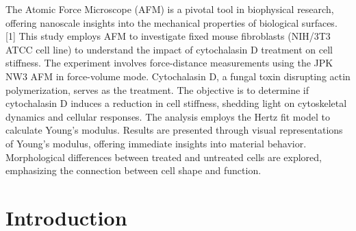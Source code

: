 \documentclass[a4paper,english,12pt,bibliography=totoc]{scrreprt}
\begin{document}
The Atomic Force Microscope (AFM) is a pivotal tool in biophysical research, offering nanoscale insights into the mechanical properties of biological surfaces. [1] This study employs AFM to investigate fixed mouse fibroblasts (NIH/3T3 ATCC cell line) to understand the impact of cytochalasin D treatment on cell stiffness. The experiment involves force-distance measurements using the JPK NW3 AFM in force-volume mode. Cytochalasin D, a fungal toxin disrupting actin polymerization, serves as the treatment. The objective is to determine if cytochalasin D induces a reduction in cell stiffness, shedding light on cytoskeletal dynamics and cellular responses. The analysis employs the Hertz fit model to calculate Young's modulus. Results are presented through visual representations of Young's modulus, offering immediate insights into material behavior. Morphological differences between treated and untreated cells are explored, emphasizing the connection between cell shape and function. 


\chapter{Introduction}

\label{cha:intro}

\end{document}
